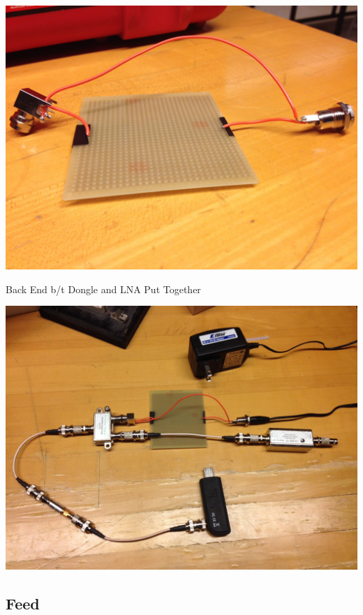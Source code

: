 \documentclass[11pt]{article} %
\begin{document}
\begin{center}
\includegraphics[scale=0.20]{lna/10.jpeg}
\end{center}

Back End b/t Dongle and LNA Put Together 

\begin{center}
\includegraphics[scale=0.20]{lna/11.jpeg}
\end{center}


\subsection{Feed}
\end{document}
